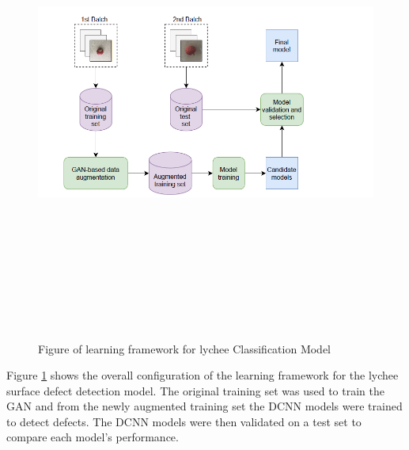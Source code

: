  \begin{figure}[H]
    \centering
    \includegraphics[width=1\textwidth,height=15cm,keepaspectratio]{Images/lycheeGANSetup.PNG}\\
    \caption{Figure of learning framework for lychee Classification Model\cite{litReviewLychee}}
    \label{fig:Figure of learning framework for lychee Classification Model (lychee Surface Defect Detection Based on Deep Convolutional Neural Networks with GAN-Based Data Augmentation) }
\end{figure}
\vspace{0.5mm}
Figure \ref{fig:Figure of learning framework for lychee Classification Model (lychee Surface Defect Detection Based on Deep Convolutional Neural Networks with GAN-Based Data Augmentation) } shows the overall configuration of the learning framework for the lychee surface defect detection model.  The original training set was used to train the GAN and from the newly augmented training set the DCNN models were trained to detect defects.  The DCNN models were then validated on a test set to compare each model's performance. 
\\ 
